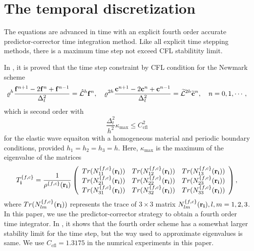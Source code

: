 \section{The temporal discretization}
The equations are advanced in time with an explicit fourth order accurate predictor-corrector time integration method. Like all explicit time stepping methods, there is a maximum time step not exceed CFL stabilitity limit.

In \cite{petersson2015wave}, it is proved that the time step constraint by CFL condition for the Newmark scheme 
\begin{equation*}
\varrho^h\frac{{\bf f}^{n+1}-2{\bf f}^n + {\bf f}^{n-1}}{\Delta_t^2} = \hat{\mathcal{L}}^h {\bf f}^n, \ \ \ 
\varrho^{2h}\frac{{\bf c}^{n+1}-2{\bf c}^n + {\bf c}^{n-1}}{\Delta_t^2} = \wt{\mathcal{L}}^{2h} \wt{\bf c}^n, \ \ \ n = 0,1,\cdots,
\end{equation*}
which is second order with
\begin{equation*}
\frac{\Delta_t^2}{h^2}\kappa_{\text{max}}\leq C_{\text{cfl}}^2
\end{equation*}
for the elastic wave equaiton with a homogeneous material and periodic boundary conditions, provided $h_1 = h_2 = h_3 = h$. Here, 
$\kappa_{\text{max}}$ is the maximum of the eigenvalue of the matrices 
\[T_{\bf i}^{\{f,c\}} = \frac{1}{\rho^{\{f,c\}}({\bf r}_{\bf i})}\left(\begin{array}{ccc}
Tr(N_{11}^{\{f,c\}}({\bf r}_{\bf i})) &  Tr(N_{12}^{\{f,c\}}({\bf r}_{\bf i}))& Tr(N_{13}^{\{f,c\}}({\bf r}_{\bf i}))\\
Tr(N_{21}^{\{f,c\}}({\bf r}_{\bf i})) & Tr(N_{22}^{\{f,c\}}({\bf r}_{\bf i})) & Tr(N_{23}^{\{f,c\}}({\bf r}_{\bf i}))\\
Tr(N_{31}^{\{f,c\}}({\bf r}_{\bf i})) & Tr(N_{32}^{\{f,c\}}({\bf r}_{\bf i})) & Tr(N_{33}^{\{f,c\}}({\bf r}_{\bf i}))\end{array}\right), \]
where $Tr(N_{lm}^{\{f,c\}}({\bf r}_{\bf i}))$ represents the trace of $3\times3$ matrix $N_{lm}^{\{f,c\}}({\bf r}_{\bf i}),l,m = 1,2,3$. In this paper, we use the predictor-corrector strategy to obtain a fourth order time integrator. In \cite{sjogreen2012fourth}, it shows that the fourth order scheme has a somewhat larger stability limit for the time step, but the way used to approximate eigenvalues is same. We use $C_{\text{cfl}} = 1.3175$ in the numrical experiments in this paper.